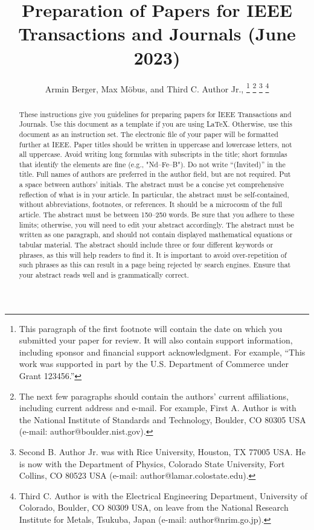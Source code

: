 \documentclass[journal,twoside,web]{ieeecolor}
\begin{document}
\title{Preparation of Papers for IEEE Transactions and Journals (June 2023)}
\author{Armin Berger, Max Möbus, and Third C. Author Jr., 
\thanks{This paragraph of the first footnote will contain the date on 
which you submitted your paper for review. It will also contain support 
information, including sponsor and financial support acknowledgment. For 
example, ``This work was supported in part by the U.S. Department of 
Commerce under Grant 123456.'' }
\thanks{The next few paragraphs should contain 
the authors' current affiliations, including current address and e-mail. For 
example, First A. Author is with the National Institute of Standards and 
Technology, Boulder, CO 80305 USA (e-mail: author@boulder.nist.gov). }
\thanks{Second B. Author Jr. was with Rice University, Houston, TX 77005 USA. He is 
now with the Department of Physics, Colorado State University, Fort Collins, 
CO 80523 USA (e-mail: author@lamar.colostate.edu).}
\thanks{Third C. Author is with 
the Electrical Engineering Department, University of Colorado, Boulder, CO 
80309 USA, on leave from the National Research Institute for Metals, 
Tsukuba, Japan (e-mail: author@nrim.go.jp).}}

\maketitle

\begin{abstract}
These instructions give you guidelines for preparing papers for 
IEEE Transactions and Journals. Use this document as a template if you are 
using \LaTeX. Otherwise, use this document as an 
instruction set. The electronic file of your paper will be formatted further 
at IEEE. Paper titles should be written in uppercase and lowercase letters, 
not all uppercase. Avoid writing long formulas with subscripts in the title; 
short formulas that identify the elements are fine (e.g., "Nd--Fe--B"). Do 
not write ``(Invited)'' in the title. Full names of authors are preferred in 
the author field, but are not required. Put a space between authors' 
initials. The abstract must be a concise yet comprehensive reflection of 
what is in your article. In particular, the abstract must be self-contained, 
without abbreviations, footnotes, or references. It should be a microcosm of 
the full article. The abstract must be between 150--250 words. Be sure that 
you adhere to these limits; otherwise, you will need to edit your abstract 
accordingly. The abstract must be written as one paragraph, and should not 
contain displayed mathematical equations or tabular material. The abstract 
should include three or four different keywords or phrases, as this will 
help readers to find it. It is important to avoid over-repetition of such 
phrases as this can result in a page being rejected by search engines. 
Ensure that your abstract reads well and is grammatically correct.
\end{abstract}
\end{document}
